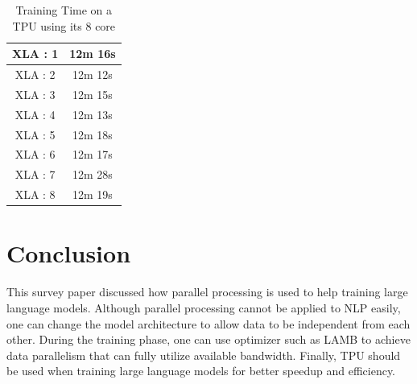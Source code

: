 \documentclass[conference]{IEEEtran}
\begin{document}
	\begin{table}[!htbp]
		\centering
		\begin{tabular}{|c|c|}
			\hline
			{XLA : 1} & 12m 16s \\ \hline
			{XLA : 2} & 12m 12s \\ \hline
			{XLA : 3} & 12m 15s \\ \hline
			{XLA : 4} & 12m 13s \\ \hline
			{XLA : 5} & 12m 18s \\ \hline
			{XLA : 6} & 12m 17s \\ \hline
			{XLA : 7} & 12m 28s \\ \hline
			{XLA : 8} & 12m 19s \\ \hline
		\end{tabular}
		\caption{\label{table:my-label} Training Time on a TPU using its 8 core}
	\end{table}
	
\section{Conclusion}
	This survey paper discussed how parallel processing is used to help training large language models. Although parallel processing cannot be applied to NLP easily, one can change the model architecture to allow data to be independent from each other. During the training phase, one can use optimizer such as LAMB to achieve data parallelism that can fully utilize available bandwidth. Finally, TPU should be used when training large language models for better speedup and efficiency.

\newpage
\

\end{document}
